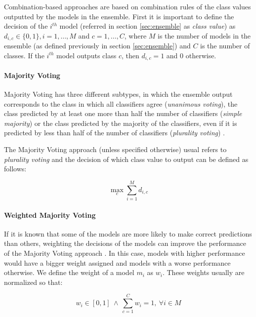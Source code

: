 Combination-based approaches are based on combination rules of the class values outputted by the models in the ensemble.
First it is important to define the decision of the $i^{th}$ model (referred in section \ref{sec:ensemble} as \textit{class value}) as $d_{i,c} \in \{ 0,1 \}, i = 1, \dots, M$ and $c = 1, \dots, C$, where $M$ is the number of models in the ensemble (as defined previously in section \ref{sec:ensemble}) and $C$ is the number of classes.
If the $i^{th}$ model outputs class $c$, then $d_{i,c} = 1$ and 0 otherwise.

\paragraph{Majority Voting}\mbox{}

Majority Voting has three different subtypes, in which the ensemble output corresponds to the class in which all classifiers agree (\textit{unanimous voting}), the class predicted by at least one more than half the number of classifiers (\textit{simple majority}) or the class predicted by the majority  of the classifiers, even if it is predicted by less than half of the number of classifiers (\textit{plurality voting}) \cite{Polikar2012a}.

The Majority Voting approach (unless specified otherwise) usual refers to \textit{plurality voting} \cite{Polikar2012a} and the decision of which class value to output can be defined as follows: 

\begin{equation}
\max_c \sum_{i = 1}^{M} d_{i,c}
\end{equation}

\paragraph{Weighted Majority Voting}\mbox{}

If it is known that some of the models are more likely to make correct predictions than others, weighting the decisions of the models can improve the performance of the Majority Voting approach \cite{Polikar2012a}.
In this case, models with higher performance would have a bigger weight assigned and models with a worse performance otherwise.
We define the weight of a model $m_i$ as $w_i$.
These weights usually are normalized so that:

\begin{equation}
w_i \in [0, 1] \ \wedge \ \sum_{c = 1}^{C} w_{i} = 1, \ \forall i \in M
\end{equation}

